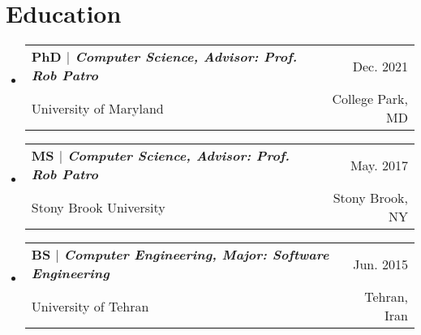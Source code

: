 \documentclass[A4,11pt]{article}
\makeatletter
\newcommand{\CVSubheading}[4]{
  \vspace{-2pt}\item
    \begin{tabular*}{0.97\textwidth}[t]{l@{\extracolsep{\fill}}r}
      \textbf{#1} & #2 \\
      \small#3 & \small #4 \\
    \end{tabular*}\vspace{-7pt}
}
\newcommand{\CVSubHeadingListStart}{\begin{itemize}[leftmargin=0.5cm, label={}]}
\newcommand{\CVSubHeadingListEnd}{\end{itemize}}
\makeatother
\begin{document}

\section{Education}
  \CVSubHeadingListStart
    \CVSubheading
      {{PhD $|$ \emph{\small{Computer Science, Advisor: Prof. Rob Patro}}}}{Dec. 2021}
      {University of Maryland}{College Park, MD}
    \CVSubheading
      {{MS $|$ \emph{\small{Computer Science, Advisor: Prof. Rob Patro}}}}{May. 2017}
      {Stony Brook University}{Stony Brook, NY}
    \CVSubheading
      {{BS $|$ \emph{\small{Computer Engineering, Major: Software Engineering}}}}{Jun. 2015}
      {University of Tehran}{Tehran, Iran}
  \CVSubHeadingListEnd

\end{document}

